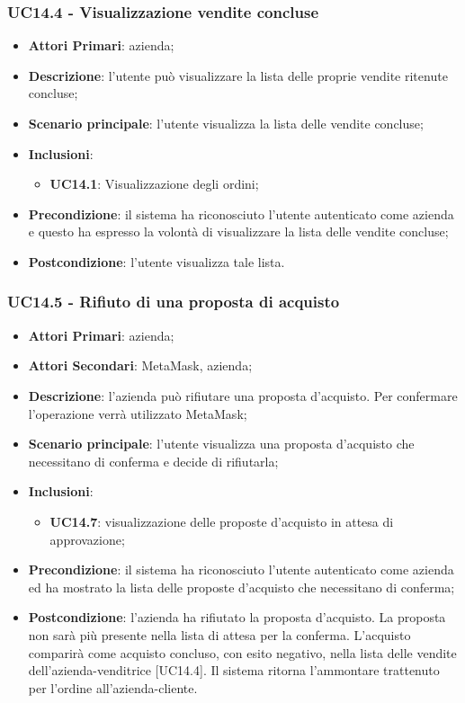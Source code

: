 \subsubsection{UC14.4 - Visualizzazione vendite concluse}
\begin{itemize}
	\item \textbf{Attori Primari}: azienda;
	\item \textbf{Descrizione}: l'utente può visualizzare la lista delle proprie vendite ritenute concluse;
	\item \textbf{Scenario principale}: l'utente visualizza la lista delle vendite concluse;
	\item \textbf{Inclusioni}:
	\begin{itemize}
		\item \textbf{UC14.1}: Visualizzazione degli ordini;
	\end{itemize}
	\item \textbf{Precondizione}: il sistema ha riconosciuto l'utente autenticato come azienda e questo ha espresso la volontà di visualizzare la lista delle vendite concluse;
	\item \textbf{Postcondizione}: l'utente visualizza tale lista.
\end{itemize}


\subsubsection{UC14.5 - Rifiuto di una proposta di acquisto}
\begin{itemize}
	\item \textbf{Attori Primari}: azienda;
	\item \textbf{Attori Secondari}: MetaMask\glo, azienda;
	\item \textbf{Descrizione}: l'azienda può rifiutare una proposta d'acquisto. Per confermare l'operazione verrà utilizzato MetaMask\glo;
	\item \textbf{Scenario principale}: l'utente visualizza una proposta d'acquisto che necessitano di conferma e decide di rifiutarla;
	\item \textbf{Inclusioni}: 
	\begin{itemize}
		\item \textbf{UC14.7}: visualizzazione delle proposte d'acquisto in attesa di approvazione;
	\end{itemize}
	\item \textbf{Precondizione}: il sistema ha riconosciuto l'utente autenticato come azienda ed ha mostrato la lista delle proposte d'acquisto che necessitano di conferma;
	\item \textbf{Postcondizione}: l'azienda ha rifiutato la proposta d'acquisto. La proposta non sarà più presente nella lista di attesa per la conferma. L'acquisto comparirà come acquisto concluso, con esito negativo, nella lista delle vendite dell'azienda-venditrice [UC14.4]. Il sistema ritorna l'ammontare trattenuto per l'ordine all'azienda-cliente.
\end{itemize}
